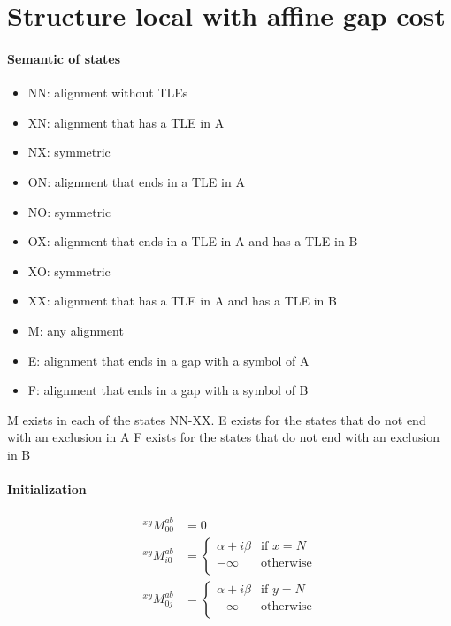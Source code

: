 \documentclass{article}
\begin{document}
\section{Structure local with affine gap cost}

\paragraph{Semantic of states}
\begin{itemize}
\item NN: alignment without TLEs
\item XN: alignment that has a TLE in A
\item NX: symmetric
\item ON: alignment that ends in a TLE in A
\item NO: symmetric
\item OX: alignment that ends in a TLE in A and has a TLE in B
\item XO: symmetric
\item XX: alignment that has a TLE in A and has a TLE in B
\end{itemize}

\begin{itemize}
\item M: any alignment
\item E: alignment that ends in a gap with a symbol of A
\item F: alignment that ends in a gap with a symbol of B
\end{itemize}

M exists in each of the states NN-XX.
E exists for the states that do not end with an exclusion in A
F exists for the states that do not end with an exclusion in B

\paragraph{Initialization}

\begin{align*}
  ^{xy}M^{ab}_{00}&=0
  \\
  ^{xy}M^{ab}_{i0}&=
  \begin{cases}
    \alpha + i\beta & \text{if $x=N$}\\
    -\infty & \text{otherwise}\\
  \end{cases} \\
  ^{xy}M^{ab}_{0j}&=
  \begin{cases}
    \alpha + i\beta & \text{if $y=N$}\\
    -\infty & \text{otherwise}\\
  \end{cases} \\
\end{align*}
\end{document}
